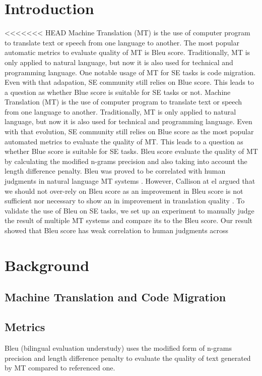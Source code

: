 \section{Introduction}
<<<<<<< HEAD
Machine Translation (MT) is the use of computer program to translate text or speech from one language to another. The most popular automatic metrics to evaluate quality of MT is Bleu score. Traditionally, MT is only applied to natural language, but now it is also used for technical and programming language. One notable usage of MT for SE tasks is code migration. Even with that adapation, SE community still relies on Blue score. This leads to a question as whether Blue score is suitable for SE tasks or not.
Machine Translation (MT) is the use of computer program to translate text or speech from one language to another. Traditionally, MT is only applied to natural language, but now it is also used for technical and programming language. Even with that evolution, SE community still relies on Blue score as the most popular automated metrics to evaluate the quality of MT. This leads to a question as whether Blue score is suitable for SE tasks. 
Bleu score evaluate the quality of MT by calculating the modified n-grams precision and also taking into account the length difference penalty. Bleu was proved to be correlated with human judgments in natural language MT systems \cite {Papineni02}. However, Callison at el argued that we should not over-rely on Bleu score as an improvement in Bleu score is not sufficient nor necessary to show an in improvement in translation quality \cite {Callison06}. To validate the use of Bleu on SE tasks, we set up an experiment to manually judge the result of multiple MT systems and compare its to the Bleu score. Our result showed that Bleu score has weak correlation to human judgments across 

\section{Background}
\subsection{Machine Translation and Code Migration}
\subsection{Metrics}
Bleu (bilingual evaluation understudy) uses the modified form of n-grams precision and length difference penalty to evaluate the quality of text generated by MT compared to referenced one.


